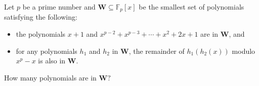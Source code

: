 Let \(p\) be a prime number and \(\mathbf{W}\subseteq \mathbb{F}_p[x]\) be the smallest set of polynomials satisfying the following:
\begin{itemize}
  \item the polynomials \(x+1\) and \(x^{p-2}+x^{p-3}+\cdots +x^2+2x+1\) are in \(\mathbf{W}\), and
  \item for any polynomials \(h_1\) and \(h_2\) in \(\mathbf{W}\), the remainder of \(h_1(h_2(x))\) modulo \(x^p-x\) is also in \(\mathbf{W}\).
\end{itemize}
How many polynomials are in \(\mathbf{W}?\)
